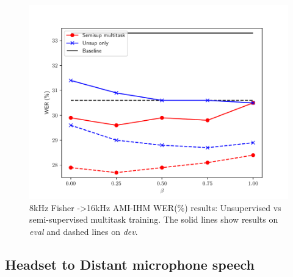 \documentclass{article}
\begin{document}
\begin{figure}[t]
  \centering
  \caption{\label{fig:multilingual_comparison} 8kHz Fisher -\textgreater 16kHz
  AMI-IHM WER(\%) results: Unsupervised vs semi-supervised multitask training. 
The solid lines show results on {\em eval} and dashed lines on {\em dev}.}
  \includegraphics[width=\columnwidth]{figures/multilingual_comparison}
\end{figure}


\subsection{Headset to Distant microphone speech}
\end{document}
